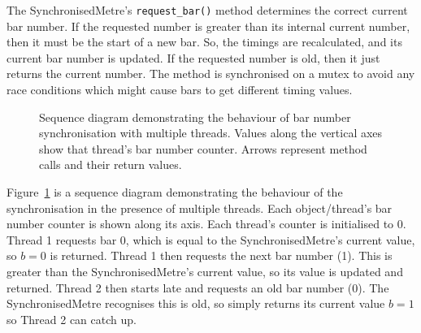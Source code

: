 \documentclass[12pt,twoside,openright]{report}
\begin{document}
The SynchronisedMetre's \verb'request_bar()' method determines the correct current bar
number. If the requested number is greater than its internal current number,
then it must be the start of a new bar. So, the timings are recalculated, and
its current bar number is updated. If the requested number is old, then it just
returns the current number. The method is synchronised on a mutex to avoid any
race conditions which might cause bars to get different timing values.

\usetikzlibrary{positioning}
\begin{figure}[ht]
    \centering
    \caption{Sequence diagram demonstrating the behaviour of bar number synchronisation with multiple threads. Values along the vertical axes show that thread's bar number counter. Arrows represent method calls and their return values.}
    \label{fig:multi-threading_sequence_diagram}
\end{figure}
\pagebreak

Figure~\ref{fig:multi-threading_sequence_diagram} is a sequence diagram demonstrating the behaviour of the synchronisation
in the presence of multiple threads. Each object/thread's bar number counter is
shown along its axis. Each thread's counter is initialised to 0. Thread 1
requests bar 0, which is equal to the SynchronisedMetre's current value, so $b=0$
is returned. Thread 1 then requests the next bar number (1). This is greater
than the SynchronisedMetre's current value, so its value is updated and returned.
Thread 2 then starts late and requests an old bar number (0). The
SynchronisedMetre recognises this is old, so simply returns its current value
$b=1$ so Thread 2 can catch up.
\end{document}
